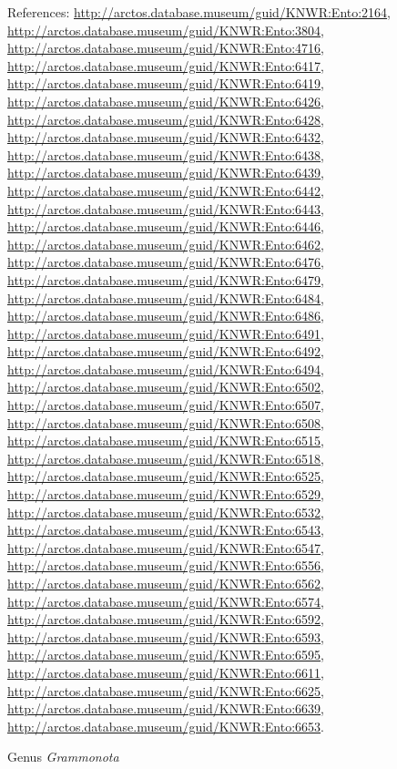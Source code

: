 \documentclass[9pt, article]{memoir}
\begin{document}
\begin{multicols}{2}
\vspace{6pt}References: 
\url{http://arctos.database.museum/guid/KNWR:Ento:2164}, 
\url{http://arctos.database.museum/guid/KNWR:Ento:3804}, 
\url{http://arctos.database.museum/guid/KNWR:Ento:4716}, 
\url{http://arctos.database.museum/guid/KNWR:Ento:6417}, 
\url{http://arctos.database.museum/guid/KNWR:Ento:6419}, 
\url{http://arctos.database.museum/guid/KNWR:Ento:6426}, 
\url{http://arctos.database.museum/guid/KNWR:Ento:6428}, 
\url{http://arctos.database.museum/guid/KNWR:Ento:6432}, 
\url{http://arctos.database.museum/guid/KNWR:Ento:6438}, 
\url{http://arctos.database.museum/guid/KNWR:Ento:6439}, 
\url{http://arctos.database.museum/guid/KNWR:Ento:6442}, 
\url{http://arctos.database.museum/guid/KNWR:Ento:6443}, 
\url{http://arctos.database.museum/guid/KNWR:Ento:6446}, 
\url{http://arctos.database.museum/guid/KNWR:Ento:6462}, 
\url{http://arctos.database.museum/guid/KNWR:Ento:6476}, 
\url{http://arctos.database.museum/guid/KNWR:Ento:6479}, 
\url{http://arctos.database.museum/guid/KNWR:Ento:6484}, 
\url{http://arctos.database.museum/guid/KNWR:Ento:6486}, 
\url{http://arctos.database.museum/guid/KNWR:Ento:6491}, 
\url{http://arctos.database.museum/guid/KNWR:Ento:6492}, 
\url{http://arctos.database.museum/guid/KNWR:Ento:6494}, 
\url{http://arctos.database.museum/guid/KNWR:Ento:6502}, 
\url{http://arctos.database.museum/guid/KNWR:Ento:6507}, 
\url{http://arctos.database.museum/guid/KNWR:Ento:6508}, 
\url{http://arctos.database.museum/guid/KNWR:Ento:6515}, 
\url{http://arctos.database.museum/guid/KNWR:Ento:6518}, 
\url{http://arctos.database.museum/guid/KNWR:Ento:6525}, 
\url{http://arctos.database.museum/guid/KNWR:Ento:6529}, 
\url{http://arctos.database.museum/guid/KNWR:Ento:6532}, 
\url{http://arctos.database.museum/guid/KNWR:Ento:6543}, 
\url{http://arctos.database.museum/guid/KNWR:Ento:6547}, 
\url{http://arctos.database.museum/guid/KNWR:Ento:6556}, 
\url{http://arctos.database.museum/guid/KNWR:Ento:6562}, 
\url{http://arctos.database.museum/guid/KNWR:Ento:6574}, 
\url{http://arctos.database.museum/guid/KNWR:Ento:6592}, 
\url{http://arctos.database.museum/guid/KNWR:Ento:6593}, 
\url{http://arctos.database.museum/guid/KNWR:Ento:6595}, 
\url{http://arctos.database.museum/guid/KNWR:Ento:6611}, 
\url{http://arctos.database.museum/guid/KNWR:Ento:6625}, 
\url{http://arctos.database.museum/guid/KNWR:Ento:6639}, 
\url{http://arctos.database.museum/guid/KNWR:Ento:6653}.

\vspace{6pt}\noindent\hspace{30pt}Genus \textit{Grammonota}



\end{multicols}
\end{document}
